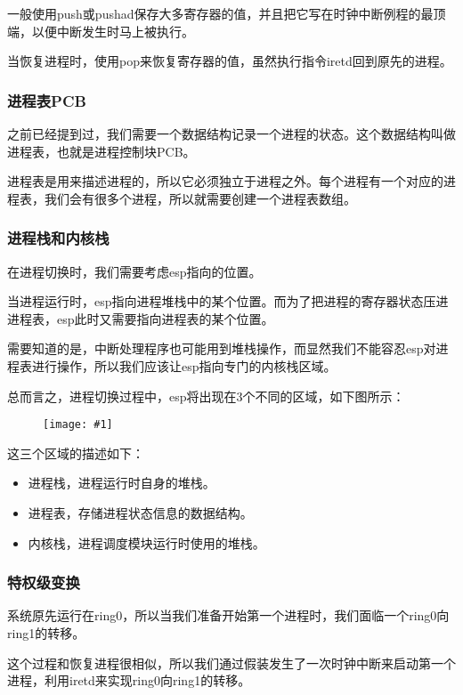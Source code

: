 \documentclass[a4paper,left=2.5cm,right=2.5cm,11pt]{report}
\newcommand{\fic}[1]{\begin{figure}[H]
		\center
		\texttt{[image: \#1]}
	\end{figure}}
\begin{document}
	一般使用push或pushad保存大多寄存器的值，并且把它写在时钟中断例程的最顶端，以便中断发生时马上被执行。\par

	当恢复进程时，使用pop来恢复寄存器的值，虽然执行指令iretd回到原先的进程。

\subsubsection{进程表PCB}
	之前已经提到过，我们需要一个数据结构记录一个进程的状态。这个数据结构叫做进程表，也就是进程控制块PCB。\par

	进程表是用来描述进程的，所以它必须独立于进程之外。每个进程有一个对应的进程表，我们会有很多个进程，所以就需要创建一个进程表数组。

\subsubsection{进程栈和内核栈}
	在进程切换时，我们需要考虑esp指向的位置。\par

	当进程运行时，esp指向进程堆栈中的某个位置。而为了把进程的寄存器状态压进进程表，esp此时又需要指向进程表的某个位置。\par

	需要知道的是，中断处理程序也可能用到堆栈操作，而显然我们不能容忍esp对进程表进行操作，所以我们应该让esp指向专门的内核栈区域。\par

	总而言之，进程切换过程中，esp将出现在3个不同的区域，如下图所示：
	\fic{1.png}

	这三个区域的描述如下：
	\begin{itemize}
		\item 进程栈，进程运行时自身的堆栈。
		\item 进程表，存储进程状态信息的数据结构。
		\item 内核栈，进程调度模块运行时使用的堆栈。
	\end{itemize}

\subsubsection{特权级变换}
	系统原先运行在ring0，所以当我们准备开始第一个进程时，我们面临一个ring0向ring1的转移。\par

	这个过程和恢复进程很相似，所以我们通过假装发生了一次时钟中断来启动第一个进程，利用iretd来实现ring0向ring1的转移。\par
\end{document}
